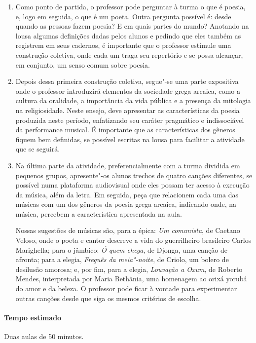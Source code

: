 \documentclass[12pt]{extarticle}
\begin{document}
\begin{enumerate}
\item
Como ponto de partida, o professor pode perguntar à turma o que é poesia,
e, logo em seguida, o que é um poeta. Outra pergunta possível é: desde quando
as pessoas fazem poesia? E em quais partes do mundo? 
Anotando na lousa algumas definições dadas pelos alunos e pedindo que eles
também as registrem em seus cadernos, é importante que o professor estimule 
uma construção coletiva, onde cada um traga seu repertório e se possa alcançar,
em conjunto, um senso comum sobre poesia.

\item
Depois dessa primeira construção coletiva, segue"-se uma parte expositiva onde 
o professor introduzirá elementos da sociedade grega arcaica, como a cultura
da oralidade, a importância da vida pública e a presença da mitologia na religiosidade. 
Neste ensejo, deve apresentar as características da poesia produzida neste período, 
enfatizando seu caráter pragmático e indissociável da performance musical.
É importante que as características dos gêneros fiquem bem definidas, se possível
escritas na lousa para facilitar a atividade que se seguirá. 

\item
Na última parte da atividade, preferencialmente com a turma dividida em pequenos 
grupos, apresente"-os alunos trechos de quatro canções diferentes, se possível numa 
plataforma audiovisual onde eles possam ter acesso à execução da música, além da letra. 
Em seguida, peça que relacionem cada uma das músicas com um dos gêneros da poesia grega 
arcaica, indicando onde, na música, percebem a característica apresentada na aula. 

Nossas sugestões de músicas são, para a épica: \emph{Um comunista}, de Caetano Veloso, 
onde o poeta e cantor descreve a vida do guerrilheiro brasileiro Carlos Marighella;
para o jâmbico: \emph{Ó quem chega}, de Djonga, uma canção de afronta; para a elegia, 
\emph{Freguês da meia"-noite}, de Criolo, um bolero de desilusão amorosa; e, por fim,
para a elegia, \emph{Louvação a Oxum}, de Roberto Mendes, interpretada por Maria Bethânia,
uma homenagem ao orixá yorubá do amor e da beleza.
O professor pode ficar à vontade para experimentar outras canções desde que siga os
mesmos critérios de escolha.  
\end{enumerate}

\paragraph{Tempo estimado} Duas aulas de 50 minutos. 
\end{document}
